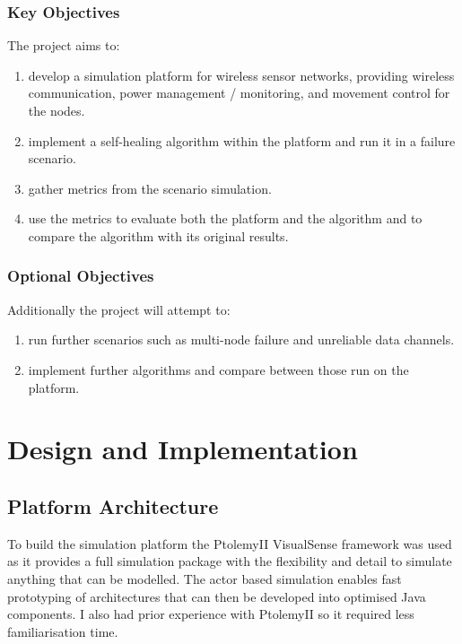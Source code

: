 \documentclass[authoryearcitations]{UoYCSproject}
\begin{document}
\subsection{Key Objectives}
The project aims to:
\begin{enumerate}
\item develop a simulation platform for wireless sensor networks, providing wireless communication, power management / monitoring, and movement control for the nodes.
\item implement a self-healing algorithm within the platform and run it in a failure scenario.
\item gather metrics from the scenario simulation.
\item use the metrics to evaluate both the platform and the algorithm and to compare the algorithm with its original results.
\end{enumerate}

\subsection{Optional Objectives}
Additionally the project will attempt to:
\begin{enumerate}
\item run further scenarios such as multi-node failure and unreliable data channels.
\item implement further algorithms and compare between those run on the platform.
\end{enumerate}

\chapter{Design and Implementation}
\label{cha:Design}

\section{Platform Architecture}

To build the simulation platform the PtolemyII VisualSense framework \citep{Baldwin2005} was used as it provides a full simulation package with the flexibility and detail to simulate anything that can be modelled. The actor based simulation enables fast prototyping of architectures that can then be developed into optimised Java components. I also had prior experience with PtolemyII so it required less familiarisation time.
\end{document}
